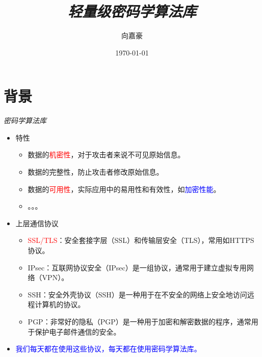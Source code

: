 \documentclass{beamer}
\title{\textit{轻量级密码学算法库}}
\author[xjh]{向嘉豪\inst{1}}
\institute{
    \inst{1}
    衡阳师范学院
}
\date{\today}
\begin{document}
\begin{frame}
    \titlepage
\end{frame}




\section{背景}

\begin{frame}{\textit{密码学算法库}}
    \begin{itemize}
        \item 特性
              \begin{itemize}
                  \item 数据的\textcolor{red}{机密性}，对于攻击者来说不可见原始信息。
                  \item 数据的完整性，防止攻击者修改原始信息。
                  \item 数据的\textcolor{red}{可用性}，实际应用中的易用性和有效性，如\textcolor{blue}{加密性能}。
                  \item 。。。
              \end{itemize}
        \item 上层通信协议
              \begin{itemize}
                  \item \textcolor{red}{SSL/TLS}：安全套接字层（SSL）和传输层安全（TLS），常用如HTTPS协议。
                  \item IPsec：互联网协议安全（IPsec）是一组协议，通常用于建立虚拟专用网络（VPN）。
                  \item SSH：安全外壳协议（SSH）是一种用于在不安全的网络上安全地访问远程计算机的协议。
                  \item PGP：非常好的隐私（PGP）是一种用于加密和解密数据的程序，通常用于保护电子邮件通信的安全。
              \end{itemize}
        \item \textcolor{blue}{我们每天都在使用这些协议，每天都在使用密码学算法库。}
    \end{itemize}
\end{frame}
\end{document}
